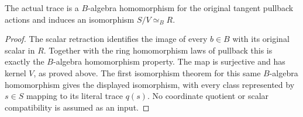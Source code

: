 \begin{theorem}
\label{hir:tangent-displacement-zero-base-algebra}
\leanok
The actual trace is a $B$-algebra homomorphism for the original tangent
pullback actions and induces an isomorphism $S/V\simeq_B R$.
\end{theorem}
\begin{proof}
The scalar retraction identifies the image of every $b\in B$ with its
original scalar in $R$. Together with the ring homomorphism laws of
pullback this is exactly the $B$-algebra homomorphism property.
The map is surjective and has kernel $V$, as proved above. The first
isomorphism theorem for this same $B$-algebra homomorphism gives the
displayed isomorphism, with every class represented by $s\in S$
mapping to its literal trace $q(s)$. No coordinate quotient or scalar
compatibility is assumed as an input.
\end{proof}
